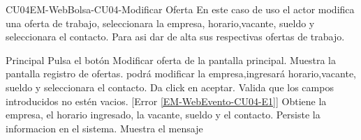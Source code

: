 \begin{UseCase}{CU04}{EM-WebBolsa-CU04-Modificar Oferta}{
		En este caso de uso el actor  modifica una oferta de trabajo, seleccionara la empresa, horario,vacante, sueldo y seleccionara el contacto. Para asi dar de alta sus respectivas ofertas de trabajo.}
{		
 		}
	\end{UseCase}
	\newpage
	
	\begin{UCtrayectoria}{Principal}
	\UCpaso[\UCactor] Pulsa el botón Modificar oferta de la pantalla principal.
	\UCpaso Muestra la pantalla registro de ofertas.
	\UCpaso[\UCactor] podrá modificar la empresa,ingresará horario,vacante, sueldo y seleccionara el contacto.
	\UCpaso[\UCactor] Da click en aceptar.
	\UCpaso Valida que los campos introducidos no estén vacios. [Error \ref{EM-WebEvento-CU04-E1}] \label{Almacenainfo}
	\UCpaso Obtiene la empresa, el horario ingresado, la vacante, sueldo y el contacto.
	\UCpaso Persiste la informacion en el sistema.
	\UCpaso Muestra el mensaje 
	
	\end{UCtrayectoria}

